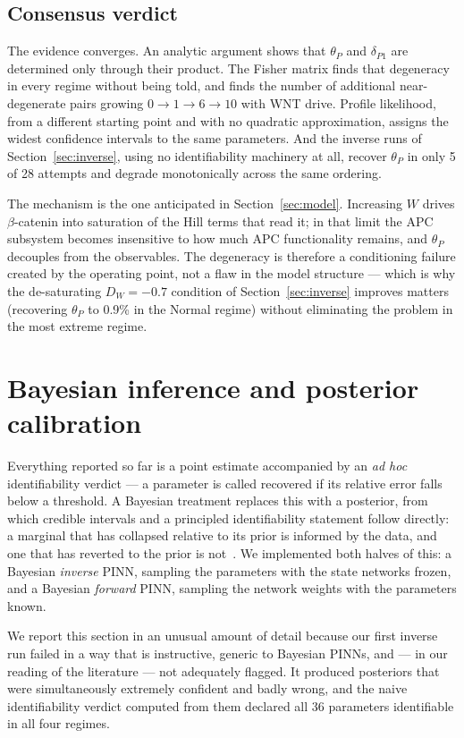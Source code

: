 \documentclass[11pt]{article}
\newcommand{\bcat}{$\beta$-\hspace{0pt}catenin}
\newcommand{\thP}{\theta_P}
\begin{document}
\subsection{Consensus verdict}

The evidence converges. An analytic argument shows that $\thP$ and
$\delta_{P1}$ are determined only through their product. The Fisher matrix finds
that degeneracy in every regime without being told, and finds the number of
additional near-degenerate pairs growing $0 \to 1 \to 6 \to 10$ with WNT drive.
Profile likelihood, from a different starting point and with no quadratic
approximation, assigns the widest confidence intervals to the same parameters.
And the inverse runs of Section~\ref{sec:inverse}, using no identifiability
machinery at all, recover $\thP$ in only 5 of 28 attempts and degrade
monotonically across the same ordering.

The mechanism is the one anticipated in Section~\ref{sec:model}. Increasing $W$
drives \bcat{} into saturation of the Hill terms that read it; in that limit the
APC subsystem becomes insensitive to how much APC functionality remains, and
$\thP$ decouples from the observables. The degeneracy is therefore a
conditioning failure created by the operating point, not a flaw in the model
structure --- which is why the de-saturating $D_W = -0.7$ condition of
Section~\ref{sec:inverse} improves matters (recovering $\thP$ to 0.9\% in the
Normal regime) without eliminating the problem in the most extreme regime.
\section{Bayesian inference and posterior calibration}
\label{sec:bayes}

Everything reported so far is a point estimate accompanied by an
\emph{ad hoc} identifiability verdict --- a parameter is called recovered if
its relative error falls below a threshold. A Bayesian treatment replaces this
with a posterior, from which credible intervals and a principled
identifiability statement follow directly: a marginal that has collapsed
relative to its prior is informed by the data, and one that has reverted to the
prior is not~\citep{yang2021bpinns}. We implemented both halves of this: a
Bayesian \emph{inverse} PINN, sampling the parameters with the state networks
frozen, and a Bayesian \emph{forward} PINN, sampling the network weights with
the parameters known.

We report this section in an unusual amount of detail because our first
inverse run failed in a way that is instructive, generic to Bayesian PINNs, and
--- in our reading of the literature --- not adequately flagged. It produced
posteriors that were simultaneously extremely confident and badly wrong, and
the naive identifiability verdict computed from them declared all 36 parameters
identifiable in all four regimes.
\end{document}

